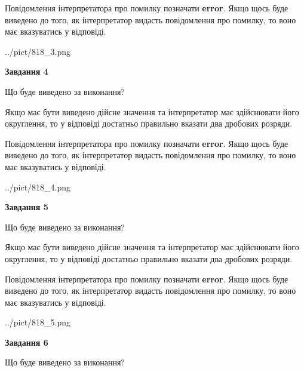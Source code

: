 \documentclass[12pt, ukrainian]{article}
\begin{document}
{\begin {Large}
Повідомлення інтерпретатора про помилку позначати \textbf{error}.
Якщо щось буде виведено до того, як інтерпретатор видасть повідомлення про помилку, 
то воно має вказуватись у відповіді. \par

\begin{center}
	{../pict/818_3.png}
\end{center}
\newpage

{\begin {center}\textbf{Завдання 4}\end {center}}\par
Що буде виведено за виконання? \par

Якщо має бути виведено дійсне значення та інтерпретатор має здійснювати його округлення, 
то у відповіді достатньо правильно вказати два дробових розряди.

Повідомлення інтерпретатора про помилку позначати \textbf{error}.
Якщо щось буде виведено до того, як інтерпретатор видасть повідомлення про помилку, 
то воно має вказуватись у відповіді. \par

\begin{center}
	{../pict/818_4.png}
\end{center}
\newpage

{\begin {center}\textbf{Завдання 5}\end {center}}\par
Що буде виведено за виконання? \par

Якщо має бути виведено дійсне значення та інтерпретатор має здійснювати його округлення, 
то у відповіді достатньо правильно вказати два дробових розряди.

Повідомлення інтерпретатора про помилку позначати \textbf{error}.
Якщо щось буде виведено до того, як інтерпретатор видасть повідомлення про помилку, 
то воно має вказуватись у відповіді. \par

\begin{center}
	{../pict/818_5.png}
\end{center}
\newpage

{\begin {center}\textbf{Завдання 6}\end {center}}\par
Що буде виведено за виконання? \par


\end{Large}}
\end{document}
